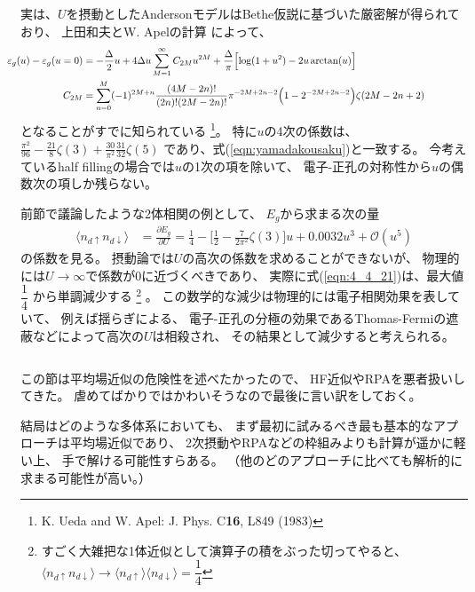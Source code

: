 \documentclass[a4j]{jarticle}
\begin{document}
実は、$U$を摂動としたAndersonモデルはBethe仮説に基づいた厳密解が得られており、
上田和夫とW. Apelの計算
によって、
\begin{align}
	\hspace{-5mm}
	\varepsilon_{g}(u)-
	\varepsilon_{g}(u=0)
	 & =
	-
	\frac{\Delta}{2}
	u
	+
	4 \Delta
	u
	\sum_{M=1}^{\infty}
	C_{2M}
	u^{2M}
	+
	\frac{\Delta}{\pi}
	\Big[
	{\rm log}(1 + u^{2})
	-
	2 u \ \!
	{\rm arctan}
	(u)
	\Big]
	\\
	C_{2M}
	 & =
	\sum_{n=0}^{M}
	(-1)^{2M+n}
	\frac{(4M-2n)!}{(2n)!(2M-2n)!}
	\pi^{-2M+2n-2}
	\Big( 1-2^{-2M+2n-2} \Big)
	\zeta(2M-2n+2)
	\hspace{15mm}
\end{align}
となることがすでに知られている
\footnote{
	K. Ueda and W. Apel: J. Phys. C{\bf 16}, L849 (1983)
}。
特に$u$の4次の係数は、
$
	\displaystyle \frac{\pi^{2}}{96}
	-
	\displaystyle \frac{21}{8}
	\zeta(3)
	+
	\displaystyle \frac{30}{\pi^{2}}
	\displaystyle \frac{31}{32}
	\zeta(5)
$
であり、式(\ref{eqn:yamadakousaku})と一致する。
今考えているhalf fillingの場合では$u$の1次の項を除いて、
電子-正孔の対称性から$u$の偶数次の項しか残らない。

前節で議論したような2体相関の例として、
$E_{g}$から求まる次の量
\begin{align}
	\langle n_{d \uparrow} n_{d \downarrow} \rangle
	 & =
	\frac{\partial E_{g}}{\partial U}
	=
	\frac{1}{4}
	-
	\bigg[
		\frac{1}{2}
		-
		\frac{7}{2 \pi^{2}}
		\zeta(3)
		\bigg]
	u
	+
	0.0032 u^{3}
	+
	\mathcal{O}(u^{5})
	\label{eqn:4_4_21}
\end{align}
の係数を見る。
摂動論では$U$の高次の係数を求めることができないが、
物理的には$U \to \infty$で係数が0に近づくべきであり、
実際に式(\ref{eqn:4_4_21})は、最大値$\dfrac{1}{4}$
から単調減少する
\footnote{
	すごく大雑把な1体近似として演算子の積をぶった切ってやると、
	$
		\langle n_{d \uparrow} n_{d \downarrow} \rangle
		\to
		\langle n_{d \uparrow} \rangle
		\langle n_{d \downarrow} \rangle
		=
		\dfrac{1}{4}
	$
}
。
この数学的な減少は物理的には電子相関効果を表していて、
例えば揺らぎによる、
電子-正孔の分極の効果であるThomas-Fermiの遮蔽などによって高次の$U$は相殺され、
その結果として減少すると考えられる。

${}$

この節は平均場近似の危険性を述べたかったので、
HF近似やRPAを悪者扱いしてきた。
虐めてばかりではかわいそうなので最後に言い訳をしておく。

結局はどのような多体系においても、
まず最初に試みるべき最も基本的なアプローチは平均場近似であり、
2次摂動やRPAなどの枠組みよりも計算が遥かに軽い上、
手で解ける可能性すらある。
（他のどのアプローチに比べても解析的に求まる可能性が高い。）
\end{document}
